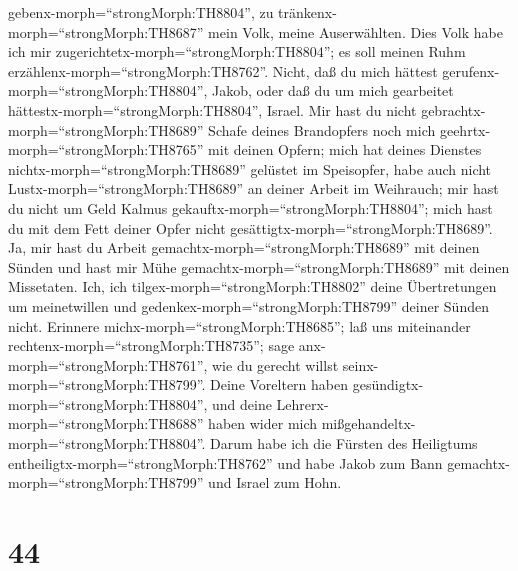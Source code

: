 gebenx-morph=``strongMorph:TH8804'', zu
tränkenx-morph=``strongMorph:TH8687'' mein Volk, meine Auserwählten.
 Dies Volk habe ich mir
zugerichtetx-morph=``strongMorph:TH8804''; es soll meinen Ruhm
erzählenx-morph=``strongMorph:TH8762''.  Nicht, daß du mich
hättest gerufenx-morph=``strongMorph:TH8804'', Jakob, oder daß du um
mich gearbeitet hättestx-morph=``strongMorph:TH8804'', Israel.
 Mir hast du nicht gebrachtx-morph=``strongMorph:TH8689''
Schafe deines Brandopfers noch mich geehrtx-morph=``strongMorph:TH8765''
mit deinen Opfern; mich hat deines Dienstes
nichtx-morph=``strongMorph:TH8689'' gelüstet im Speisopfer, habe auch
nicht Lustx-morph=``strongMorph:TH8689'' an deiner Arbeit im Weihrauch;
 mir hast du nicht um Geld Kalmus
gekauftx-morph=``strongMorph:TH8804''; mich hast du mit dem Fett deiner
Opfer nicht gesättigtx-morph=``strongMorph:TH8689''. Ja, mir hast du
Arbeit gemachtx-morph=``strongMorph:TH8689'' mit deinen Sünden und hast
mir Mühe gemachtx-morph=``strongMorph:TH8689'' mit deinen Missetaten.
 Ich, ich tilgex-morph=``strongMorph:TH8802'' deine
Übertretungen um meinetwillen und gedenkex-morph=``strongMorph:TH8799''
deiner Sünden nicht.  Erinnere
michx-morph=``strongMorph:TH8685''; laß uns miteinander
rechtenx-morph=``strongMorph:TH8735''; sage
anx-morph=``strongMorph:TH8761'', wie du gerecht willst
seinx-morph=``strongMorph:TH8799''.  Deine Voreltern haben
gesündigtx-morph=``strongMorph:TH8804'', und deine
Lehrerx-morph=``strongMorph:TH8688'' haben wider mich
mißgehandeltx-morph=``strongMorph:TH8804''.  Darum habe ich
die Fürsten des Heiligtums entheiligtx-morph=``strongMorph:TH8762'' und
habe Jakob zum Bann gemachtx-morph=``strongMorph:TH8799'' und Israel zum
Hohn.

\hypertarget{section-43}{%
\section{44}\label{section-43}}

